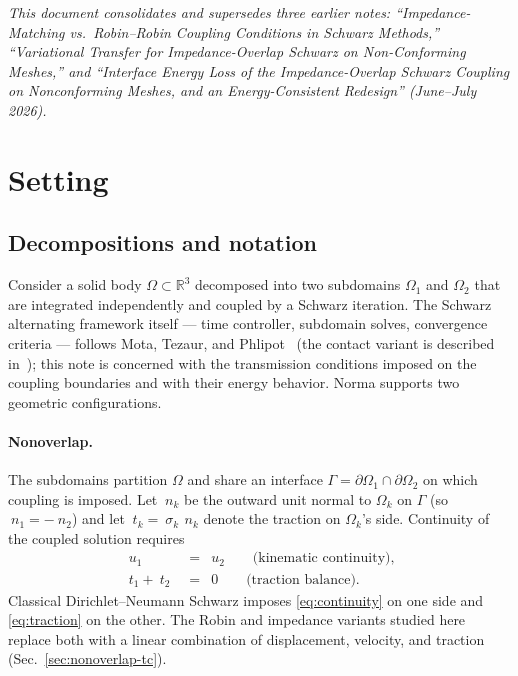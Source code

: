 \documentclass[11pt]{article}
\begin{document}
\medskip
\noindent\emph{This document consolidates and supersedes three earlier notes:
``Impedance-Matching vs.\ Robin--Robin Coupling Conditions in Schwarz
Methods,'' ``Variational Transfer for Impedance-Overlap Schwarz on
Non-Conforming Meshes,'' and ``Interface Energy Loss of the Impedance-Overlap
Schwarz Coupling on Nonconforming Meshes, and an Energy-Consistent
Redesign'' (June--July 2026).}

\tableofcontents

\section{Setting}
\label{sec:setting}

\subsection{Decompositions and notation}

Consider a solid body $\Omega \subset \mathbb{R}^3$ decomposed into two
subdomains $\Omega_1$ and $\Omega_2$ that are integrated independently and
coupled by a Schwarz iteration. The Schwarz alternating framework itself
--- time controller, subdomain solves, convergence criteria --- follows
Mota, Tezaur, and Phlipot~\cite{MotaTezaurPhlipot2022} (the contact variant
is described in~\cite{MotaKoliesnikovaTezaurHoy2023}); this note is
concerned with the transmission conditions imposed on the coupling
boundaries and with their energy behavior. Norma supports two geometric
configurations.

\paragraph{Nonoverlap.} The subdomains partition $\Omega$ and share an
interface $\Gamma = \partial\Omega_1 \cap \partial\Omega_2$ on which coupling
is imposed. Let $~n_k$ be the outward unit normal to $\Omega_k$ on $\Gamma$
(so $~n_1 = -~n_2$) and let $~t_k = ~\sigma_k\,~n_k$ denote the traction on
$\Omega_k$'s side. Continuity of the coupled solution requires
\begin{align}
  ~u_1 \;&=\; ~u_2 \qquad \text{(kinematic continuity),}
  \label{eq:continuity} \\
  ~t_1 + ~t_2 \;&=\; ~0 \qquad \text{(traction balance).}
  \label{eq:traction}
\end{align}
Classical Dirichlet--Neumann Schwarz imposes \eqref{eq:continuity} on one
side and \eqref{eq:traction} on the other. The Robin and impedance variants
studied here replace both with a linear combination of displacement,
velocity, and traction (Sec.~\ref{sec:nonoverlap-tc}).
\end{document}

